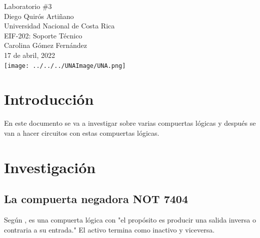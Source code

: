 \documentclass[stu, 12pt, letterpaper, donotrepeattitle, floatsintext, natbib, helv]{apa7}
\begin{document}
\begin{titlepage}
    \centering
    \vfill
    \LARGE Laboratorio \#3\\
    \vskip2cm
    \large Diego Quirós Artiñano \\
    Universidad Nacional de Costa Rica \\
    EIF-202: Soporte Técnico \\ 
    Carolina Gómez Fernández \\
    17 de abril, 2022 \\
    \vfill
    \texttt{[image: ../../../UNAImage/UNA.png]} \\
    \vfill
    \vfill
\end{titlepage}

\addto{}
\tableofcontents
\setcounter{tocdepth}{2}
\newpage
\renewcommand{\listfigurename}{\largeÍndice de fíguras}
\listoffigures
\newpage


\section*{Introducción}
{}
En este documento se va a investigar sobre varias compuertas lógicas y después se van a hacer circuitos con estas compuertas lógicas.
\section*{Investigación}
{}

\subsection*{La compuerta negadora NOT 7404}
Según \cite{CompuertaLogicaNOT}, es una compuerta lógica con "el propósito es producir una salida inversa o contraria a su entrada." El activo termina como inactivo y viceversa.
\end{document}
